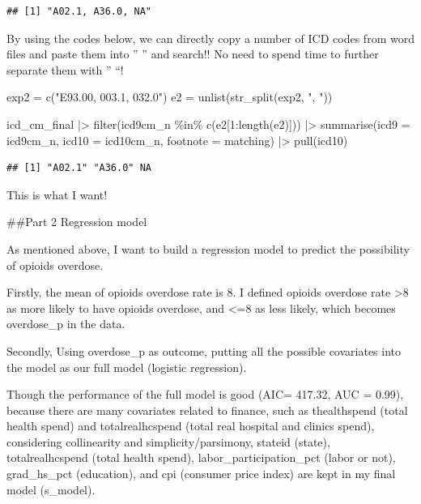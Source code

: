 \documentclass[
]{article}
\newenvironment{Shaded}{\begin{snugshade}}{\end{snugshade}}
\newcommand{\AttributeTok}[1]{\textcolor[rgb]{0.77,0.63,0.00}{#1}}
\newcommand{\DecValTok}[1]{\textcolor[rgb]{0.00,0.00,0.81}{#1}}
\newcommand{\FunctionTok}[1]{\textcolor[rgb]{0.00,0.00,0.00}{#1}}
\newcommand{\NormalTok}[1]{#1}
\newcommand{\OtherTok}[1]{\textcolor[rgb]{0.56,0.35,0.01}{#1}}
\newcommand{\SpecialCharTok}[1]{\textcolor[rgb]{0.00,0.00,0.00}{#1}}
\newcommand{\StringTok}[1]{\textcolor[rgb]{0.31,0.60,0.02}{#1}}
\begin{document}
\begin{verbatim}
## [1] "A02.1, A36.0, NA"
\end{verbatim}

By using the codes below, we can directly copy a number of ICD codes
from word files and paste them into '' '' and search!! No need to spend
time to further separate them with '' ``!

\begin{Shaded}
\begin{Highlighting}[]
\NormalTok{exp2 }\OtherTok{=} \FunctionTok{c}\NormalTok{(}\StringTok{"E93.00, 003.1, 032.0"}\NormalTok{)  }
\NormalTok{e2 }\OtherTok{=} \FunctionTok{unlist}\NormalTok{(}\FunctionTok{str\_split}\NormalTok{(exp2, }\StringTok{", "}\NormalTok{))}

\NormalTok{icd\_cm\_final }\SpecialCharTok{|\textgreater{}}
  \FunctionTok{filter}\NormalTok{(icd9cm\_n }\SpecialCharTok{\%in\%} \FunctionTok{c}\NormalTok{(e2[}\DecValTok{1}\SpecialCharTok{:}\FunctionTok{length}\NormalTok{(e2)])) }\SpecialCharTok{|\textgreater{}} 
  \FunctionTok{summarise}\NormalTok{(}\AttributeTok{icd9 =}\NormalTok{ icd9cm\_n, }\AttributeTok{icd10 =}\NormalTok{ icd10cm\_n, }\AttributeTok{footnote =}\NormalTok{ matching) }\SpecialCharTok{|\textgreater{}}
  \FunctionTok{pull}\NormalTok{(icd10)     }
\end{Highlighting}
\end{Shaded}

\begin{verbatim}
## [1] "A02.1" "A36.0" NA
\end{verbatim}

This is what I want!

\#\#Part 2 Regression model

As mentioned above, I want to build a regression model to predict the
possibility of opioids overdose.

Firstly, the mean of opioids overdose rate is 8. I defined opioids
overdose rate \textgreater8 as more likely to have opioids overdose, and
\textless=8 as less likely, which becomes overdose\_p in the data.

Secondly, Using overdose\_p as outcome, putting all the possible
covariates into the model as our full model (logistic regression).

Though the performance of the full model is good (AIC= 417.32, AUC =
0.99), because there are many covariates related to finance, such as
thealthspend (total health spend) and totalrealhcspend (total real
hospital and clinics spend), considering collinearity and
simplicity/parsimony, stateid (state), totalrealhcspend (total health
spend), labor\_participation\_pct (labor or not), grad\_hs\_pct
(education), and cpi (consumer price index) are kept in my final model
(s\_model).
\end{document}
